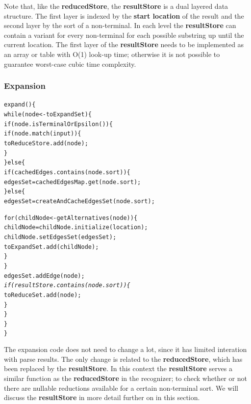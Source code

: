 \documentclass[a4paper,10pt]{article}
\begin{document}
Note that, like the {\bf reducedStore}, the {\bf resultStore} is a dual layered data structure. The first layer is indexed by the {\bf start location} of the result and the second layer by the sort of a non-terminal. In each level the {\bf resultStore} can contain a variant for every non-terminal for each possible substring up until the current location. The first layer of the {\bf resultStore} needs to be implemented as an array or table with O(1) look-up time; otherwise it is not possible to guarantee worst-case cubic time complexity.

\pagebreak
\subsubsection{Expansion}
{\small
\begin{alltt}
expand()\{
  while(node <- toExpandSet)\{
    if(node.isTerminalOrEpsilon())\{
      if(node.match(input))\{
        toReduceStore.add(node);
      \}
    \}else\{
      if(cachedEdges.contains(node.sort))\{
        edgesSet = cachedEdgesMap.get(node.sort);
      \}else\{
        edgesSet = createAndCacheEdgesSet(node.sort);
        
        for(childNode <- getAlternatives(node))\{
          childNode = childNode.initialize(location);
          childNode.setEdgesSet(edgesSet);
          toExpandSet.add(childNode);
        \}
      \}
      edgesSet.addEdge(node);
      \textit{
      if(resultStore.contains(node.sort))\{}
        toReduceSet.add(node);
      \}
    \}
  \}
\}
\end{alltt}
}

The expansion code does not need to change a lot, since it has limited interation with parse results. The only change is related to the {\bf reducedStore}, which has been replaced by the {\bf resultStore}. In this context the {\bf resultStore} serves a similar function as the {\bf reducedStore} in the recognizer; to check whether or not there are nullable reductions available for a certain non-terminal sort. We will discuss the {\bf resultStore} in more detail further on in this section.

\pagebreak
\end{document}
